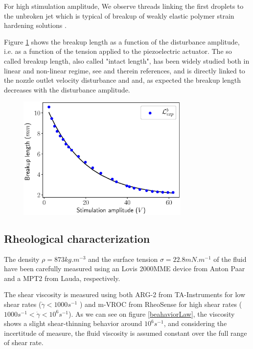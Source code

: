 \documentclass[twocolumn,10pt]{asme2ej}
\begin{document}
For high stimulation amplitude, We observe threads linking the first droplets to the unbroken jet which is typical of breakup of weakly elastic polymer strain hardening solutions \cite{christanti2002effect}.

Figure \ref{fig:LbInk} shows the breakup length as a function of the disturbance amplitude, i.e. as a function of the tension applied to the piezoelectric actuator. The so called breakup length, also called "intact length", has been widely studied both in linear and non-linear regime, see \cite{eggers2008physics} and therein references, and is directly linked to the nozzle outlet velocity disturbance \cite{pimbley1977satellite} and \cite{rosello2018influence} and, as expected the breakup length decreases with the disturbance amplitude.

\begin{figure}[H]
    \centering
    \includegraphics[width=8.5cm]{LbInk.eps}
    \caption{}
    \label{fig:LbInk}
\end{figure}



\subsection{Rheological characterization}\label{sec:rheo}

The density $\rho = 873 kg.m^{−3}$ and the surface tension $\sigma = 22.8 mN.m^{-1}$ of the fluid have been carefully measured using an Lovis 2000MME device from Anton Paar and a MPT2 from Lauda, respectively. 

The shear viscosity is measured using both ARG-2 from TA-Instruments for low shear rates ($\dot{\gamma} < 1000 s^{−1}$ ) and m-VROC from RheoSense for high shear rates ($1000 s^{−1}<\dot{\gamma} < 10^6 s^{−1}$). As we can see on figure \ref{beahaviorLaw}, the viscosity shows a slight shear-thinning behavior around $10^6s^{-1}$, and considering the incertitude of measure, the fluid viscosity is assumed constant over the full range of shear rate.
\end{document}
